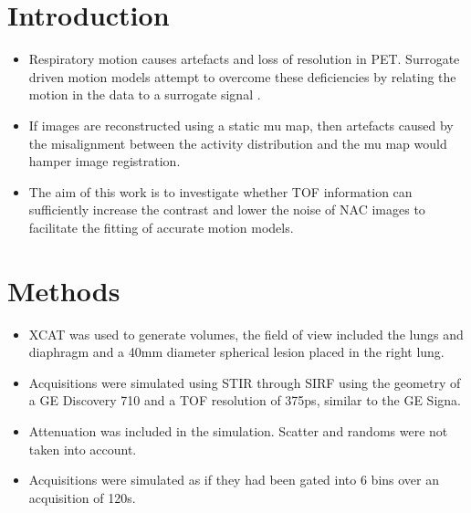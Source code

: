 \documentclass[portrait,color=UCLburgundy,margin=2cm]{uclposter}
\begin{document}
\begin{multicols}{2}
\large

\section*{Introduction}
\begin{highlightbox}[UCLlightgreen]
    \begin{itemize}
        \item Respiratory motion causes artefacts and loss of resolution in PET. Surrogate driven motion models attempt to overcome these deficiencies by relating the motion in the data to a surrogate signal \cite{McClelland2013}.
        \item If images are reconstructed using a static \gls{mu map}, then artefacts caused by the misalignment between the activity distribution and the \gls{mu map} would hamper image registration.
        \item The aim of this work is to investigate whether \gls{TOF} information can sufficiently increase the contrast and lower the noise of \gls{NAC} images to facilitate the fitting of accurate motion models.
    \end{itemize}
\end{highlightbox}

\vspace{-2.0cm}

\section*{Methods}
\begin{itemize}

    \vspace{1.0cm}
    
    \subsection*{\underline{\textbf{Simulation}}}
    
    \vspace{-1.0cm}
    
    \item XCAT was used to generate volumes, the field of view included the lungs and diaphragm and a 40mm diameter spherical lesion placed in the right lung.
    \item  Acquisitions were simulated using STIR \cite{Efthimiou2018} through SIRF using the geometry of a GE Discovery 710 and a \gls{TOF} resolution of 375ps, similar to the GE Signa.
    \item Attenuation was included in the simulation. Scatter and randoms were not taken into account.
    \item  Acquisitions were simulated as if they had been gated into 6 bins over an acquisition of 120s.
    

\end{itemize}
\end{multicols}
\end{document}
